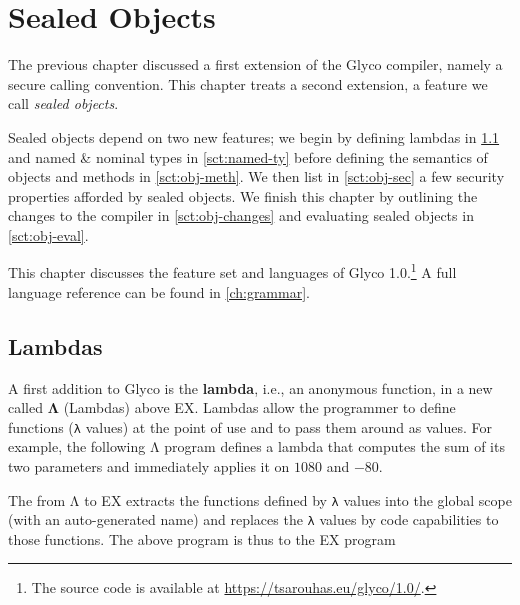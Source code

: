 \documentclass[main.tex]{subfiles}
\begin{document}
\onlyinsubfile{\mainmatter{}}

\chapter{Sealed Objects}
The previous chapter discussed a first extension of the Glyco compiler, namely a secure calling convention. This chapter treats a second extension, a feature we call \emph{sealed objects}.

Sealed objects depend on two new features; we begin by defining lambdas in \cref{sct:lambda} and named \& nominal types in \cref{sct:named-ty} before defining the semantics of objects and methods in \cref{sct:obj-meth}. We then list in \cref{sct:obj-sec} a few security properties afforded by sealed objects. We finish this chapter by outlining the changes to the compiler in \cref{sct:obj-changes} and evaluating sealed objects in \cref{sct:obj-eval}.

This chapter discusses the feature set and languages of Glyco 1.0.\footnote{The source code is available at \url{https://tsarouhas.eu/glyco/1.0/}.} A full language reference can be found in \cref{ch:grammar}.

\section{Lambdas} \label{sct:lambda}
A first addition to Glyco is the \textbf{lambda}, i.e., an anonymous function, in a new  called \textbf{Λ} (Lambdas) above EX. Lambdas allow the programmer to define functions (\texttt{λ} values) at the point of use and to pass them around as values. For example, the following Λ program defines a lambda that computes the sum of its two parameters and immediately applies it on $1080$ and $-80$.

The  from Λ to EX extracts the functions defined by \texttt{λ} values into the global scope (with an auto-generated name) and replaces the \texttt{λ} values by code capabilities to those functions. The above program is thus \lowered{} to the EX program
\end{document}
